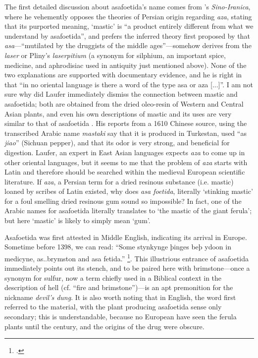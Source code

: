 The first detailed discussion about asafoetida's name comes from \autocite[353-362]{laufer_sino-iranica_1919}'s \textit{Sino-Iranica}, where he vehemently opposes the theories of Persian origin regarding \textit{aza}, stating that its purported meaning, `mastic' is ``a product entirely different from what we understand by asafoetida'', and prefers the inferred theory first proposed by \textcite[41]{garcia_da_orta_colloquies_1913} that \textit{asa}---``mutilated by the druggists of the middle ages''---somehow derives from the \textit{laser} or Pliny's \textit{laserpitium} (a synonym for silphium, an important spice, medicine, and aphrodisiac used in antiquity just mentioned above). None of the two explanations are supported with documentary evidence, and he is right in that ``in no oriental language is there a word of the type asa or aza [...]''. I am not sure why did Laufer immediately dismiss the connection between mastic and asafoetida; both are obtained from the dried oleo-resin of Western and Central Asian plants, and even his own descriptions of mastic and its uses are very similar to that of asafoetida \autocite[252]{laufer_sino-iranica_1919}. His reports from a 1610 Chinese source, using the transcribed Arabic name \textit{mastaki} say that it is produced in Turkestan, used ``as \textit{jiao}'' (Sichuan pepper), and that its odor is very strong, and beneficial for digestion. Laufer, an expert in East Asian languages expects \textit{aza} to come up in other oriental languages, but it seems to me that the problem of \textit{aza} starts with Latin and therefore should be searched within the medieval European scientific literature. If \textit{aza}, a Persian term for a dried resinous substance (i.e. mastic) loaned by scribes of Latin existed, why does \textit{asa foetida}, literally `stinking mastic' for a foul smelling dried resinous gum sound so impossible? In fact, one of the Arabic names for asafoetida literally translates to `the mastic of the giant ferula'; but here `mastic' is likely to simply mean `gum'.

Asafoetida was first attested in Middle English, indicating its arrival in Europe. Sometime before 1398, we can read: ``Some stynkynge þinges beþ ydoon in medicyne, as..brymston and asa fetida.'' \footcite[asafoetida]{oed}. This illustrious entrance of asafoetida immediately points out its stench, and to be paired here with brimstone---once a synonym for sulfur, now a term chiefly used in a Biblical context in the description of hell (cf. ``fire and brimstone'')---is an apt premonition for the nickname \textit{devil's dung}. It is also worth noting that in English, the word first referred to the material, with the plant producing asafoetida sense only secondary; this is understandable, because no European have seen the ferula plants until the  century, and the origins of the drug were obscure.

